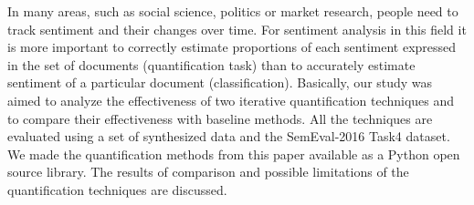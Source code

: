 In many areas, such as social science, politics or market research, people need to track sentiment and their changes over time. For sentiment analysis in this field it is more important to correctly estimate proportions of each sentiment expressed in the set of documents (quantification task) than to accurately estimate sentiment of a particular document (classification). Basically, our study was aimed to analyze the effectiveness of two iterative quantification techniques and to compare their effectiveness with baseline methods. All the techniques are evaluated using a set of synthesized data and the SemEval-2016 Task4 dataset. We made the quantification methods from this paper available as a Python open source library. The results of comparison and possible limitations of the quantification techniques are discussed.
